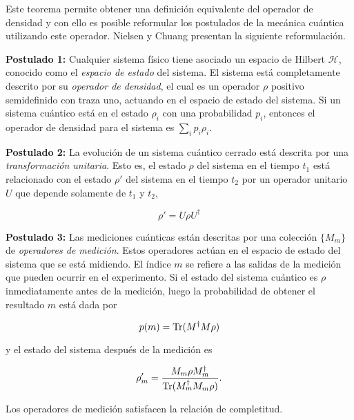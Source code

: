 Este teorema  permite obtener una definición equivalente del operador de densidad y con ello es posible reformular los postulados de la mecánica cuántica utilizando este operador. Nielsen y Chuang {\cite{nielsen_chuang_2010}} presentan la siguiente reformulación.


\setlength{\leftskip}{1cm}

 \textbf{Postulado 1:} Cualquier sistema físico tiene asociado un espacio de Hilbert $\mathcal{H}$, conocido como el \textit{espacio de estado} del sistema. El sistema está completamente descrito por su \textit{operador de densidad}, el cual es un operador $\rho$ positivo semidefinido con traza uno, actuando en el espacio de estado del sistema. Si un sistema cuántico está en el estado $\rho_i$ con una probabilidad $p_i$, entonces el operador de densidad para el sistema es $\sum_{i}p_i\rho_i$.


\textbf{Postulado 2:} La evolución de un sistema cuántico cerrado está descrita por una \textit{transformación unitaria}. Esto es, el estado $\rho$ del sistema en el tiempo $t_1$ está relacionado con el estado $\rho'$ del sistema en el tiempo $t_2$ por un operador unitario $U$ que depende solamente de $t_1$ y $t_2$, 

\begin{equation}\label{postulado 2}
\rho'=U\rho U^{\dagger}
\end{equation}


\textbf{Postulado 3:} Las mediciones cuánticas están descritas por una colección $\{M_m\}$ de \textit{operadores de medición}. Estos operadores actúan en el espacio de estado del sistema que se está midiendo. El índice $m$ se refiere a las salidas de la medición que pueden ocurrir en el experimento. Si el estado del sistema cuántico es $\rho$ inmediatamente antes de la medición, luego la probabilidad de obtener el resultado $m$ está dada por

\begin{equation}\label{probaility3postulate}
	p(m)={\rm Tr}(M^\dagger M \rho)
\end{equation}


y el estado del sistema después de la medición es 


\begin{equation}\label{state3postulate}
	\rho_m'=\dfrac{M_m\rho M_m^\dagger}{{\rm Tr}(M_m^\dagger M_m \rho)}.
\end{equation}


Los operadores de medición satisfacen la relación de completitud.

